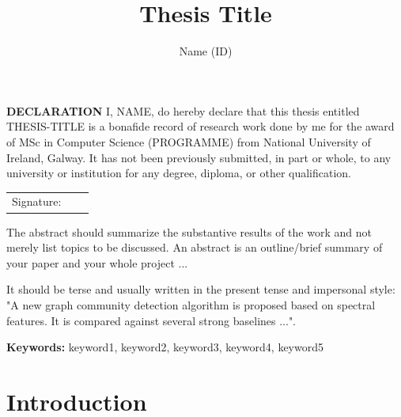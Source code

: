 \documentclass[oneside,12pt]{Classes/RoboticsLaTeX}
\title{\Large{Thesis Title}}
\author{Name (ID)}
\begin{document}
\begin{spacing}{1}
\maketitle
\end{spacing}

\newpage\null\thispagestyle{empty}\newpage

\setcounter{secnumdepth}{3}
\setcounter{tocdepth}{3}

\frontmatter
\textbf{DECLARATION} 
I, NAME, do hereby declare that this thesis entitled THESIS-TITLE is a bonafide record of research work done by me for the award of MSc in Computer Science (PROGRAMME) from National University of Ireland, Galway. It has not been previously submitted, in part or whole, to any university or institution for any degree, diploma, or other qualification. 
\newline

\begin{tabular}{@{}p{.5in}p{4in}@{}}
Signature: & ~~\hrulefill \\
\end{tabular}
\newpage


%
%


\begin{abstracts}
The abstract should summarize the substantive results of the work and not merely list topics to be discussed. An abstract is an outline/brief summary of your paper and your whole project ... 

It should be terse and usually written in the present tense and impersonal style: "A new graph community detection algorithm is proposed based on spectral features. It is compared against several strong baselines ...".

\textbf{Keywords: } keyword1, keyword2, keyword3, keyword4, keyword5
\end{abstracts}


\tableofcontents
\listoffigures
\listoftables
\printglossary[title=List of Acronyms,type=\acronymtype]

\mainmatter

\chapter{Introduction}
\label{chap:introduction}
\end{document}
